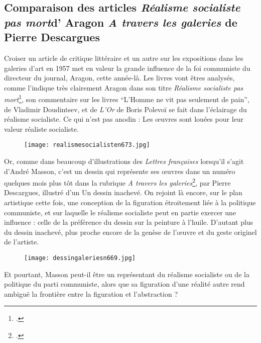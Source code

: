 \subsection{Comparaison des articles \emph{ Réalisme socialiste pas mort}d' Aragon \emph{A travers les galeries} de Pierre Descargues}

	Croiser un article de critique littéraire et un autre sur les expositions dans les galeries d’art en 1957 met en valeur la grande influence de la foi communiste du directeur du journal, Aragon, cette année-là. Les livres vont êtres analysés, comme l’indique très clairement Aragon dans son titre \emph{Réalisme socialiste pas mort}\footcite{realsoc}, son commentaire sur les livres \enquote{L’Homme ne vit pas seulement de pain}, de Vladimir Doudintsev, et de \emph{L’Or} de Boris Polevoï se fait dans l’éclairage du réalisme socialiste. Ce qui n’est pas anodin : Les \oe{}uvres sont louées pour leur valeur réaliste socialiste. 

\begin{figure}[H]
   \centering
   \texttt{[image: realismesocialisten673.jpg]}
	\caption{\cite{realsoc}}\label{fig:Réalistesocialistepasmort}
\end{figure}

	

	Or, comme dans beaucoup d’illustrations des \emph{Lettres françaises }lorsqu’il s’agit d’André Masson, c’est un dessin qui représente ses \oe{}uvres dans un numéro quelques mois plus tôt dans la rubrique \emph{A travers les galeries}\footcite{atraversgaleries}, par Pierre Descargues, illustré d'un Un dessin inachevé. On rejoint là encore, sur le plan artistique cette fois, une conception de la figuration étroitement liée à la politique communiste, et sur laquelle le réalisme socialiste peut en partie exercer une influence : celle de la préférence du dessin sur la peinture à l’huile. D’autant plus du dessin inachevé, plus proche encore de la genèse de l’\oe{}uvre et du geste originel de l’artiste. 

\begin{figure}[H]
   \centering
   \texttt{[image: dessingaleriesn669.jpg]}
	\caption{\cite{realsoc}}\label{fig:Atraverslesgaleries}
\end{figure}



	Et pourtant, Masson peut-il être un représentant du réalisme socialiste ou de la politique du parti communiste, alors que sa figuration d’une réalité autre rend ambiguë la frontière entre la figuration et l’abstraction ? 
	

